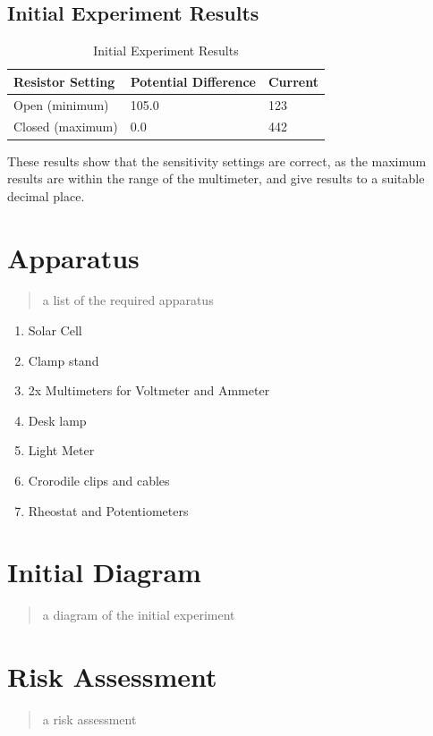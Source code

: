 \documentclass{article}
\begin{document}
\subsection{Initial Experiment Results}
\begin{table}[!ht]
\centering
\caption{Initial Experiment Results}
\label{Initial Experiment Results}
\begin{tabular}{|l|l|l|}
\hline
\textbf{Resistor Setting} & \textbf{Potential Difference} & \textbf{Current} \\ \hline
Open (minimum)            & 105.0                         & 123              \\ \hline
Closed (maximum)          & 0.0                           & 442              \\ \hline
\end{tabular}
\end{table}
These results show that the sensitivity settings are correct, as the maximum results are within the range of the multimeter, and give results to a suitable decimal place.


\section{Apparatus}
\begin{quote}
a list of the required apparatus
\end{quote}
\begin{enumerate}
  \item Solar Cell
  \item Clamp stand
  \item 2x Multimeters for Voltmeter and Ammeter
  \item Desk lamp
  \item Light Meter
  \item Crorodile clips and cables
  \item Rheostat and Potentiometers
\end{enumerate}

\section{Initial Diagram}
\begin{quote}
a diagram of the initial experiment
\end{quote}

\section{Risk Assessment}
\begin{quote}
a risk assessment
\end{quote}
\end{document}
